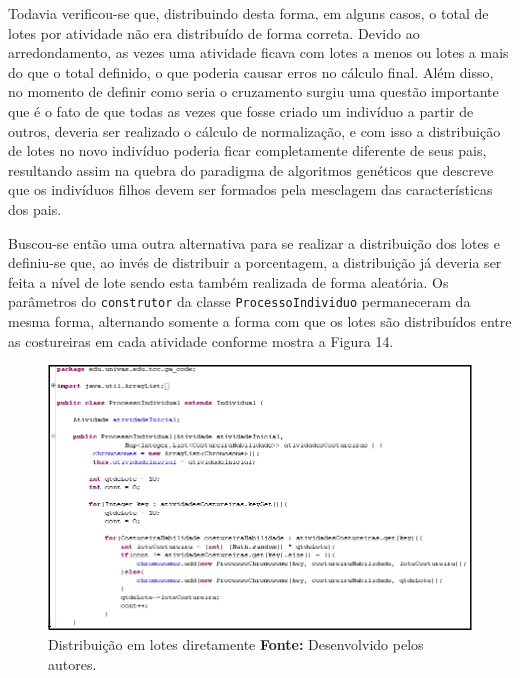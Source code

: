  \par Todavia verificou-se que, distribuindo desta forma, em alguns casos, o total de lotes por atividade não era distribuído
 de forma correta. Devido ao arredondamento, as vezes uma atividade ficava com lotes a menos ou lotes a mais do que o total
 definido, o que poderia causar erros no cálculo final. Além disso, no momento de definir como seria o cruzamento 
 surgiu uma questão importante que é o fato de que todas as vezes que fosse criado um indivíduo a partir de outros, deveria
 ser realizado o cálculo de normalização, e com isso a distribuição de lotes no novo indivíduo poderia ficar completamente
 diferente de seus pais, resultando assim na quebra do paradigma de algoritmos genéticos que descreve que os indivíduos filhos
 devem ser formados pela mesclagem das características dos pais. 


\par Buscou-se então uma outra alternativa para se realizar a distribuição dos lotes e definiu-se que, ao invés de distribuir
a porcentagem, a distribuição já deveria ser feita a nível de lote sendo esta também realizada de forma aleatória. Os parâmetros
do \texttt{construtor} da classe \texttt{ProcessoIndividuo} permaneceram da mesma forma, alternando somente a forma com que 
os lotes são distribuídos entre as costureiras em cada atividade conforme mostra
a Figura 14.

\begin{figure}[h!]
	\centerline{\includegraphics[scale=0.7]{./imagens/tentativa_2_individual.png}}
	\caption[Distribuição em lotes diretamente]
	{Distribuição em lotes diretamente \textbf{Fonte:} Desenvolvido pelos autores.}
	\label{fig:exemplo1}
\end{figure}

